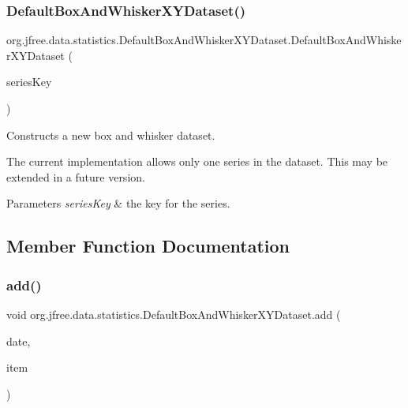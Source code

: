 \subsubsection{\texorpdfstring{Default\+Box\+And\+Whisker\+X\+Y\+Dataset()}{DefaultBoxAndWhiskerXYDataset()}}
{\footnotesize\ttfamily org.\+jfree.\+data.\+statistics.\+Default\+Box\+And\+Whisker\+X\+Y\+Dataset.\+Default\+Box\+And\+Whisker\+X\+Y\+Dataset (\begin{DoxyParamCaption}\item[{Comparable}]{series\+Key }\end{DoxyParamCaption})}

Constructs a new box and whisker dataset. 

The current implementation allows only one series in the dataset. This may be extended in a future version.


\begin{DoxyParams}{Parameters}
{\em series\+Key} & the key for the series. \\
\hline
\end{DoxyParams}


\subsection{Member Function Documentation}
\mbox{\label{classorg_1_1jfree_1_1data_1_1statistics_1_1_default_box_and_whisker_x_y_dataset_a14130718ba2ad78bb9273684877f8e8c}} 
\subsubsection{\texorpdfstring{add()}{add()}}
{\footnotesize\ttfamily void org.\+jfree.\+data.\+statistics.\+Default\+Box\+And\+Whisker\+X\+Y\+Dataset.\+add (\begin{DoxyParamCaption}\item[{Date}]{date,  }\item[{\mbox{\hyperlink{classorg_1_1jfree_1_1data_1_1statistics_1_1_box_and_whisker_item}{Box\+And\+Whisker\+Item}}}]{item }\end{DoxyParamCaption})}

